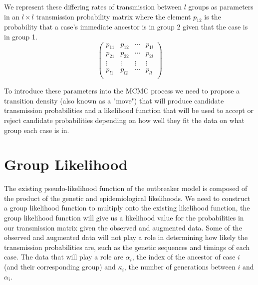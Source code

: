 \documentclass[11pt,a4paper]{report}
\begin{document}
We represent these differing rates of transmission between $l$ groups as parameters in an $l \times l$ transmission probability matrix where the element $p_{12}$ is the probability that a case's immediate ancestor is in group 2 given that the case is in group 1.
\[ \left( \begin{array}{cccc}
p_{11} & p_{12} & \cdots & p_{1l} \\
p_{21} & p_{22} & \cdots & p_{2l} \\
\vdots & \vdots & \vdots & \vdots \\
p_{l1} & p_{l2} & \cdots & p_{ll} \\
\end{array} \right) \] 

To introduce these parameters into the MCMC process we need to propose a transition density (also known as a "move") that will produce candidate transmission probabilities and a likelihood function that will be used to accept or reject candidate probabilities depending on how well they fit the data on what group each case is in.

\section{Group Likelihood}
The existing pseudo-likelihood function of the outbreaker model is composed of the product of the genetic and epidemiological likelihoods. We need to construct a group likelihood function to multiply onto the existing likelihood function, the group likelihood function will give us a likelihood value for the probabilities in our transmission matrix given the observed and augmented data. Some of the observed and augmented data will not play a role in determining how likely the transmission probabilities are, such as the genetic sequences and timings of each case. The data that will play a role are $\alpha_i$, the index of the ancestor of case $i$ (and their corresponding group) and $\kappa_i$, the number of generations between $i$ and $\alpha_i$.\\
\end{document}
